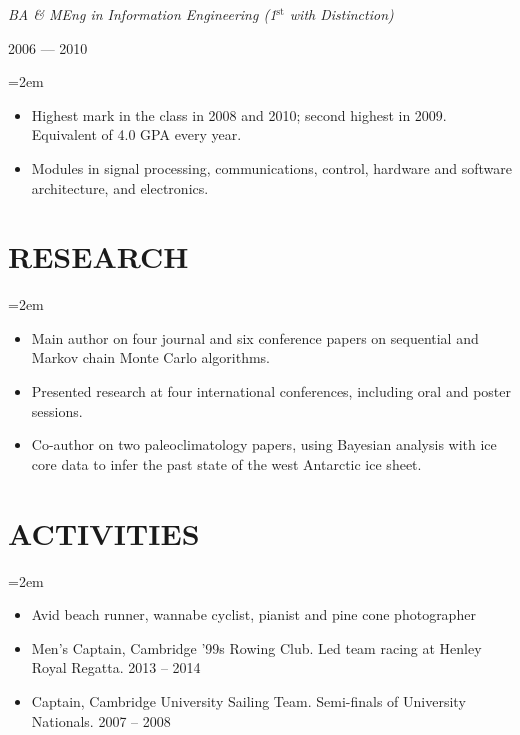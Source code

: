 \documentclass[letterpaper,10pt]{article}
\newcommand{\NewPart}[1]{\vspace{-1em} \section*{\uppercase{#1}}}
\newcommand{\SubHeading}[1]{\noindent\textit{#1}}
\newcommand{\DateBox}[1]{\colorbox{light-gray}{\parbox{8em}{\hfill\color{White}#1}}}
\newcommand{\Details}[1]{\hangindent=2em\hangafter=0\small#1\normalsize\par}
\newcommand{\EducationEntry}[3]{%
                \SubHeading{#1} \hfill \DateBox{#2} \par
                \Details{#3} }
\begin{document}
\EducationEntry{BA \& MEng in Information Engineering (1$^{\text{st}}$ with Distinction)}{2006 --- 2010}{
\begin{itemize}
  \item Highest mark in the class in 2008 and 2010; second highest in 2009. Equivalent of 4.0 GPA every year.
  \item Modules in signal processing, communications, control, hardware and software architecture, and electronics.
\end{itemize}
}



\NewPart{Research}
\Details{
\begin{itemize}
 \item Main author on four journal and six conference papers on sequential and Markov chain Monte Carlo algorithms.
 \item Presented research at four international conferences, including oral and poster sessions.
 \item Co-author on two paleoclimatology papers, using Bayesian analysis with ice core data to infer the past state of the west Antarctic ice sheet.
\end{itemize}
}



\NewPart{Activities}

\Details{
\begin{itemize}
 \item Avid beach runner, wannabe cyclist, pianist and  pine cone photographer
 \item Men's Captain, Cambridge '99s Rowing Club. Led team racing at Henley Royal Regatta. 2013 -- 2014
 \item Captain, Cambridge University Sailing Team. Semi-finals of University Nationals. 2007 -- 2008
\end{itemize}
}
\end{document}
